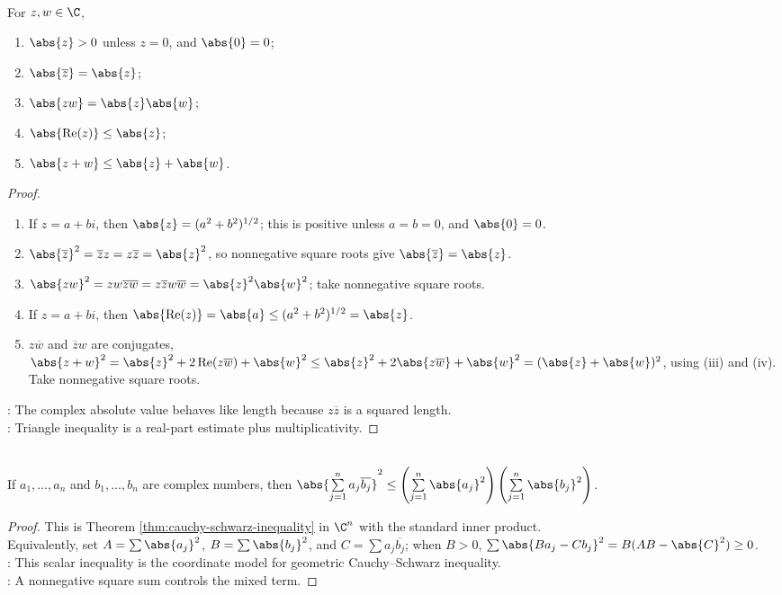 \begin{theorem} \label{thm:complex-absolute-value-identities} \\
For $z,w\in\C$,
\begin{enumerate}[label=(\roman*)]
\setlength{\itemsep}{0pt}
\item $\abs{z}>0$ unless $z=0$, and $\abs{0}=0$;
\item $\abs{\overline{z}}=\abs{z}$;
\item $\abs{zw}=\abs{z}\abs{w}$;
\item $\abs{\operatorname{Re}(z)}\leq\abs{z}$;
\item $\abs{z+w}\leq\abs{z}+\abs{w}$.
\end{enumerate}
\begin{proof}
\begin{enumerate}[label=(\roman*)]
\setlength{\itemsep}{0pt}
\item If $z=a+bi$, then $\abs{z}=(a^2+b^2)^{1/2}$; this is positive unless $a=b=0$, and $\abs{0}=0$.
\item $\abs{\overline{z}}^2=\overline{z}z=z\overline{z}=\abs{z}^2$, so nonnegative square roots give $\abs{\overline{z}}=\abs{z}$.
\item $\abs{zw}^2=zw\overline{zw}=z\overline{z}w\overline{w}=\abs{z}^2\abs{w}^2$; take nonnegative square roots.
\item If $z=a+bi$, then $\abs{\operatorname{Re}(z)}=\abs{a}\leq(a^2+b^2)^{1/2}=\abs{z}$.
\item $z\overline{w}$ and $\overline{z}w$ are conjugates, $\abs{z+w}^2 =\abs{z}^2+2\operatorname{Re}(z\overline{w})+\abs{w}^2 \leq\abs{z}^2+2\abs{z\overline{w}}+\abs{w}^2 =(\abs{z}+\abs{w})^2$, using (iii) and (iv). Take nonnegative square roots.
\end{enumerate}
: The complex absolute value behaves like length because $z\overline{z}$ is a squared length.\\
: Triangle inequality is a real-part estimate plus multiplicativity.
\end{proof}
\end{theorem}

\begin{theorem} \label{thm:finite-schwarz-inequality-complex-scalars} \\
If $a_1,\ldots,a_n$ and $b_1,\ldots,b_n$ are complex numbers, then $\abs{\sum\limits_{j=1}^{n}a_j\overline{b_j}}^2\leq \left(\sum\limits_{j=1}^{n}\abs{a_j}^2\right) \left(\sum\limits_{j=1}^{n}\abs{b_j}^2\right)$.
\begin{proof}
This is Theorem \ref{thm:cauchy-schwarz-inequality} in $\C^n$ with the standard inner product.\\
Equivalently, set $A=\sum\abs{a_j}^2$, $B=\sum\abs{b_j}^2$, and $C=\sum a_j\overline{b_j}$; when $B>0$, $\sum\abs{Ba_j-Cb_j}^2=B(AB-\abs{C}^2)\geq0$.\\
: This scalar inequality is the coordinate model for geometric Cauchy--Schwarz inequality.\\
: A nonnegative square sum controls the mixed term.
\end{proof}
\end{theorem}
